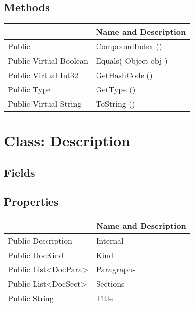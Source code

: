 \documentclass[11pt, oneside, a4paper]{book}
\begin{document}
\subsection{Methods}
\begin{center}
\begin{tabular}{| p{3cm} | p{12cm} | }
\hline
\textbf{ } & \textbf{ Name and Description}\\
\hline
 Public  &  CompoundIndex ()\hypertarget{SoftwareEngineeringTools.{}Documentation.{}CompoundIndex.{}CompoundIndex}{}\\
\hline
 Public  Virtual  Boolean &  Equals(\hypertarget{SoftwareEngineeringTools.{}Documentation.{}CompoundIndex.{}Equals\_Object}{} Object  obj  )\\
\hline
 Public  Virtual  Int32 &  GetHashCode ()\hypertarget{SoftwareEngineeringTools.{}Documentation.{}CompoundIndex.{}GetHashCode}{}\\
\hline
 Public  Type &  GetType ()\hypertarget{SoftwareEngineeringTools.{}Documentation.{}CompoundIndex.{}GetType}{}\\
\hline
 Public  Virtual  String &  ToString ()\hypertarget{SoftwareEngineeringTools.{}Documentation.{}CompoundIndex.{}ToString}{}\\
\hline
\end{tabular}
\end{center}
 


\hypertarget{SoftwareEngineeringTools.{}Documentation.{}Description}{}
\section{Class: Description}

\subsection{Fields}

\subsection{Properties}
\begin{center}
\begin{tabular}{| p{3cm} | p{12cm} | }
\hline
\textbf{ } & \textbf{ Name and Description}\\
\hline
 Public  Description &  Internal\hypertarget{SoftwareEngineeringTools.{}Documentation.{}Description.{}Internal}{}\\
\hline
 Public  DocKind &  Kind\hypertarget{SoftwareEngineeringTools.{}Documentation.{}Description.{}Kind}{}\\
\hline
 Public  List<DocPara> &  Paragraphs\hypertarget{SoftwareEngineeringTools.{}Documentation.{}Description.{}Paragraphs}{}\\
\hline
 Public  List<DocSect> &  Sections\hypertarget{SoftwareEngineeringTools.{}Documentation.{}Description.{}Sections}{}\\
\hline
 Public  String &  Title\hypertarget{SoftwareEngineeringTools.{}Documentation.{}Description.{}Title}{}\\
\hline
\end{tabular}
\end{center}
\end{document}
